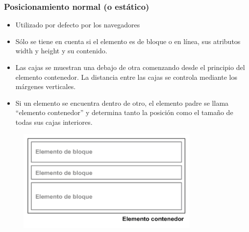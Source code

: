 \documentclass[ucs]{beamer}
\begin{document}

\begin{frame}
\frametitle{Posicionamiento normal (o estático)}

\begin{itemize}
  \item Utilizado por defecto por los navegadores
  \item Sólo se tiene en cuenta si el elemento es de bloque o en línea, sus atributos width y height y su contenido.
  \item Las cajas se muestran una debajo de otra comenzando desde el principio del elemento contenedor. La distancia entre las cajas se controla mediante los márgenes verticales.
  \item Si un elemento se encuentra dentro de otro, el elemento padre se llama ``elemento contenedor'' y determina tanto la posición como el tamaño de todas sus cajas interiores.
\end{itemize}


\begin{center}
\begin{figure}[p]
\includegraphics[width=0.8\textwidth]{figs/f0502.png}
\end{figure}
\end{center}

\end{frame}


\end{document}
